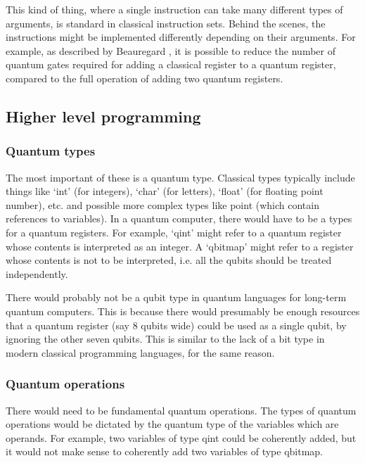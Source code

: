 This kind of thing, where a single instruction can take many different types of arguments, is standard in classical instruction sets. Behind the scenes, the instructions might be implemented differently depending on their arguments. For example, as described by Beauregard \cite{beauregard2003ShorImplementation}, it is possible to reduce the number of quantum gates required for adding a classical register to a quantum register, compared to the full operation of adding two quantum registers.

\subsection{Higher level programming}
\subsubsection{Quantum types}
The most important of these is a quantum type. Classical types typically include things like `int' (for integers), `char' (for letters), `float' (for floating point number), etc. and possible more complex types like point (which contain references to variables). In a quantum computer, there would have to be a types for a quantum registers. For example, `qint' might refer to a quantum register whose contents is interpreted as an integer. A `qbitmap' might refer to a register whose contents is not to be interpreted, i.e. all the qubits should be treated independently.

There would probably not be a qubit type in quantum languages for long-term quantum computers. This is because there would presumably be enough resources that a quantum register (say 8 qubits wide) could be used as a single qubit, by ignoring the other seven qubits. This is similar to the lack of a bit type in modern classical programming languages, for the same reason.

\subsubsection{Quantum operations}

There would need to be fundamental quantum operations. The types of quantum operations would be dictated by the quantum type of the variables which are operands. For example, two variables of type qint could be coherently added, but it would not make sense to coherently add two variables of type qbitmap.

